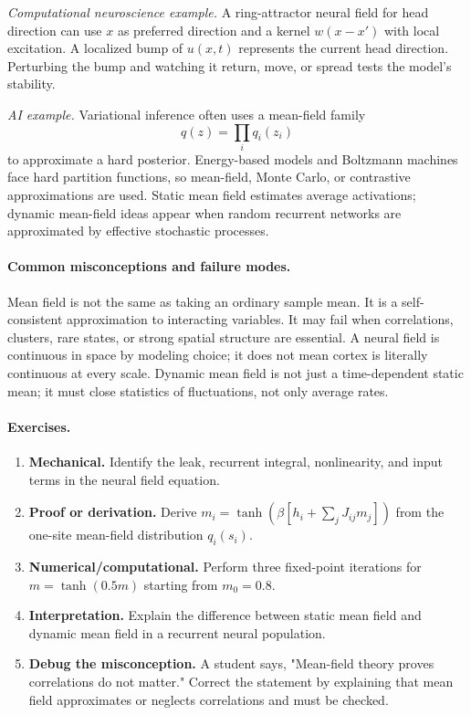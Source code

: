\emph{Computational neuroscience example.}
A ring-attractor neural field for head direction can use \(x\) as preferred direction and a kernel \(w(x-x')\) with local excitation. A localized bump of \(u(x,t)\) represents the current head direction. Perturbing the bump and watching it return, move, or spread tests the model's stability.

\emph{AI example.}
Variational inference often uses a mean-field family
\[
q(z)=\prod_i q_i(z_i)
\]
to approximate a hard posterior. Energy-based models and Boltzmann machines face hard partition functions, so mean-field, Monte Carlo, or contrastive approximations are used. Static mean field estimates average activations; dynamic mean-field ideas appear when random recurrent networks are approximated by effective stochastic processes.

\paragraph{Common misconceptions and failure modes.}
Mean field is not the same as taking an ordinary sample mean. It is a self-consistent approximation to interacting variables. It may fail when correlations, clusters, rare states, or strong spatial structure are essential. A neural field is continuous in space by modeling choice; it does not mean cortex is literally continuous at every scale. Dynamic mean field is not just a time-dependent static mean; it must close statistics of fluctuations, not only average rates.

\paragraph{Exercises.}
\begin{enumerate}[label=\textbf{49.4.\arabic*.}, leftmargin=*]
\item \textbf{Mechanical.} Identify the leak, recurrent integral, nonlinearity, and input terms in the neural field equation.
\item \textbf{Proof or derivation.} Derive \(m_i=\tanh(\beta[h_i+\sum_jJ_{ij}m_j])\) from the one-site mean-field distribution \(q_i(s_i)\).
\item \textbf{Numerical/computational.} Perform three fixed-point iterations for \(m=\tanh(0.5m)\) starting from \(m_0=0.8\).
\item \textbf{Interpretation.} Explain the difference between static mean field and dynamic mean field in a recurrent neural population.
\item \textbf{Debug the misconception.} A student says, "Mean-field theory proves correlations do not matter." Correct the statement by explaining that mean field approximates or neglects correlations and must be checked.
\end{enumerate}


